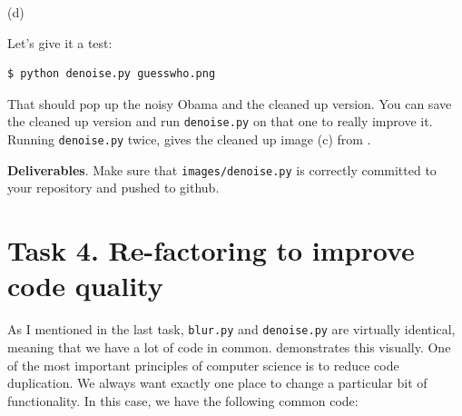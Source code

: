 \begin{marginfigure}
\begin{center}
(d) 
\end{center}
\label{obama}
\end{marginfigure}


Let's give it a test:

\begin{lstlisting}[style=BashInputStyle]
$ python denoise.py guesswho.png
\end{lstlisting}

\noindent That should pop up the noisy Obama and the cleaned up version. You can save the cleaned up version and run {\tt denoise.py} on that one to really improve it. Running {\tt denoise.py} twice, gives the cleaned up image (c) from .  

\begin{callout}{\bcplume}
{\bf Deliverables}. Make sure that {\tt images/denoise.py} is correctly committed to your repository and pushed to github. 
\end{callout}

\vspace{10mm}
\section{Task 4. Re-factoring to improve code quality}

As I mentioned in the last task, {\tt blur.py} and {\tt denoise.py} are virtually identical, meaning that we have a lot of code in common.  demonstrates this visually. One of the most important principles of computer science is to reduce code duplication. We always want exactly one place to change a particular bit of functionality.   In this case, we have the following common code:

